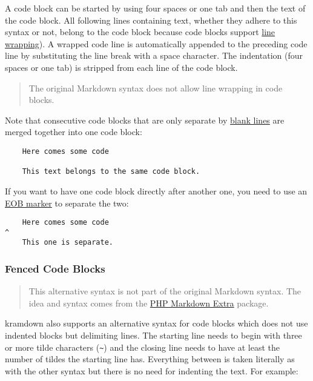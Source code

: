 \documentclass[a4paper]{article}
\begin{document}
A code block can be started by using four spaces or one tab and then the
text of the code block. All following lines containing text, whether
they adhere to this syntax or not, belong to the code block because code
blocks support \protect\hyperlink{line-wrapping}{line wrapping}). A
wrapped code line is automatically appended to the preceding code line
by substituting the line break with a space character. The indentation
(four spaces or one tab) is stripped from each line of the code block.

\begin{quote}
The original Markdown syntax does not allow line wrapping in code
blocks.
\end{quote}

Note that consecutive code blocks that are only separate by
\protect\hyperlink{blank-lines}{blank lines} are merged together into
one code block:

\begin{verbatim}
    Here comes some code

    This text belongs to the same code block.
\end{verbatim}

If you want to have one code block directly after another one, you need
to use an \protect\hyperlink{eob-marker}{EOB marker} to separate the
two:

\begin{verbatim}
    Here comes some code
^
    This one is separate.
\end{verbatim}

\hypertarget{fenced-code-blocks}{\subsubsection{Fenced Code
Blocks}\label{fenced-code-blocks}}

\begin{quote}
This alternative syntax is not part of the original Markdown syntax. The
idea and syntax comes from the
\href{http://michelf.com/projects/php-markdown/extra/}{PHP Markdown
Extra} package.
\end{quote}

kramdown also supports an alternative syntax for code blocks which does
not use indented blocks but delimiting lines. The starting line needs to
begin with three or more tilde characters (\texttt{\textasciitilde{}})
and the closing line needs to have at least the number of tildes the
starting line has. Everything between is taken literally as with the
other syntax but there is no need for indenting the text. For example:
\end{document}
